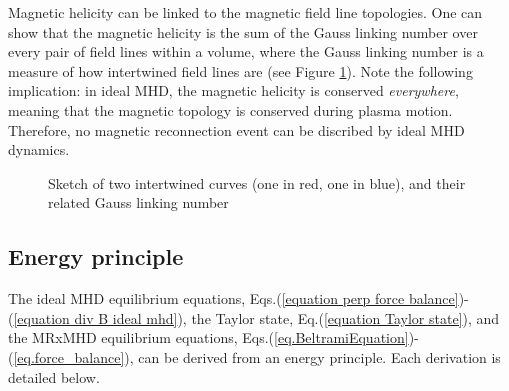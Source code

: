 \documentclass[my_thesis.tex]{subfiles}
\begin{document}
Magnetic helicity can be linked to the magnetic field line topologies. One can show \citep{moffattDegreeKnottednessTangled1969, arnoldTopologicalPropertiesMagnetic1998, bergerIntroductionMagneticHelicity1999} that the magnetic helicity is the sum of the Gauss linking number over every pair of field lines within a volume, where the Gauss linking number is a measure of how intertwined field lines are (see Figure \ref{fig gauss linking number}). Note the following implication: in ideal MHD, the magnetic helicity is conserved \emph{everywhere}, meaning that the magnetic topology is conserved during plasma motion. Therefore, no magnetic reconnection event can be discribed by ideal MHD dynamics.

\begin{figure}
	\hspace{.125\linewidth}
	\hfill
	\hspace{.125\linewidth}
	\caption{Sketch of two intertwined curves (one in red, one in blue), and their related Gauss linking number}
	\label{fig gauss linking number}
\end{figure}



\subsection{Energy principle}
The ideal MHD equilibrium equations, Eqs.(\ref{equation perp force balance})-(\ref{equation div B ideal mhd}), the Taylor state, Eq.(\ref{equation Taylor state}), and the MRxMHD equilibrium equations, Eqs.(\ref{eq.BeltramiEquation})-(\ref{eq.force_balance}), can be derived from an energy principle. Each derivation is detailed below.
\end{document}
